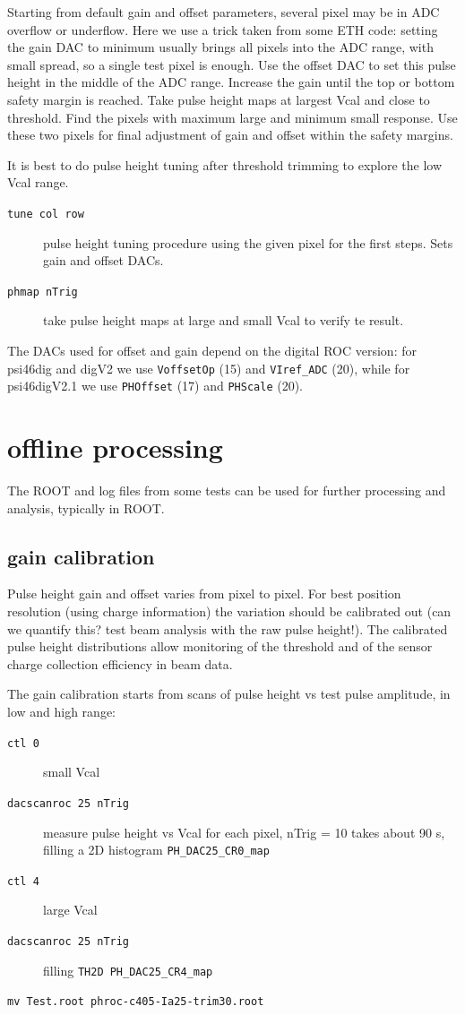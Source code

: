 \documentclass[english]{article}
\begin{document}
Starting from default gain and offset parameters, several pixel may
be in ADC overflow or underflow. Here we use a trick taken from some
ETH code: setting the gain DAC to minimum usually brings all pixels
into the ADC range, with small spread, so a single test pixel is enough.
Use the offset DAC to set this pulse height in the middle of the ADC
range. Increase the gain until the top or bottom safety margin is
reached. Take pulse height maps at largest Vcal and close to threshold.
Find the pixels with maximum large and minimum small response. Use
these two pixels for final adjustment of gain and offset within the
safety margins.

It is best to do pulse height tuning after threshold trimming to explore
the low Vcal range. 
\begin{description}
\item [\texttt{tune~col~row}] pulse height tuning procedure using the given
pixel for the first steps. Sets gain and offset DACs. 
\item [\texttt{phmap~nTrig}] take pulse height maps at large and small Vcal
to verify te result. 
\end{description}
The DACs used for offset and gain depend on the digital ROC version:
for psi46dig and digV2 we use \texttt{VoffsetOp} (15) and \texttt{VIref\_ADC}
(20), while for psi46digV2.1 we use \texttt{PHOffset} (17) and \texttt{PHScale}
(20).


\section{offline processing}

The ROOT and log files from some tests can be used for further processing
and analysis, typically in ROOT.


\subsection{gain calibration\label{sub:gaincalib}}

Pulse height gain and offset varies from pixel to pixel. For best
position resolution (using charge information) the variation should
be calibrated out (can we quantify this? test beam analysis with the
raw pulse height!). The calibrated pulse height distributions allow
monitoring of the threshold and of the sensor charge collection efficiency
in beam data.

The gain calibration starts from scans of pulse height vs test pulse
amplitude, in low and high range: 
\begin{description}
\item [\texttt{ctl\ 0}] small Vcal 
\item [\texttt{dacscanroc\ 25\ nTrig}] measure pulse height
vs Vcal for each pixel, nTrig = 10 takes about 90 s, filling a 2D
histogram \texttt{PH\_DAC25\_CR0\_map} 
\item [\texttt{ctl\ 4}] large Vcal 
\item [\texttt{dacscanroc\ 25\ nTrig}] filling \texttt{TH2D
PH\_DAC25\_CR4\_map} 
\end{description}
\texttt{mv Test.root phroc-c405-Ia25-trim30.root}
\end{document}
